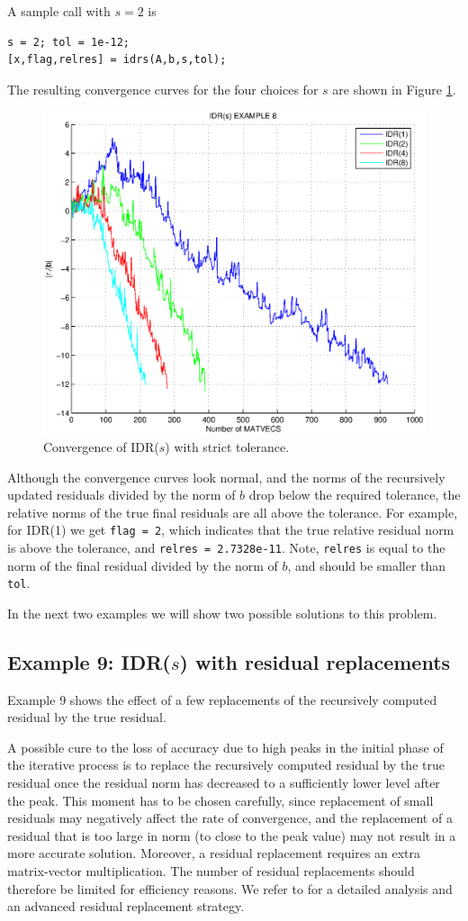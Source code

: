 \documentclass[prodmode,acmtoms]{acmsmall}
\begin{document}
A sample call with $s=2$ is 
\begin{verbatim}
s = 2; tol = 1e-12;
[x,flag,relres] = idrs(A,b,s,tol);
\end{verbatim}

The resulting convergence curves for the four choices for $s$ are shown in Figure \ref{fig:example8}.
\begin{figure}
\centering
\includegraphics[width=.60\linewidth]{example8}
\caption{Convergence of IDR($s$) with strict tolerance.}
\label{fig:example8}
\end{figure}
Although the convergence curves look normal, and the norms of the recursively updated residuals divided by the norm 
of $b$ drop below the required tolerance, the relative norms of the true final residuals are all above the tolerance. 
For example, for IDR(1) we get {\tt flag = 2}, which indicates that the true relative residual norm is above the 
tolerance, and {\tt relres = 2.7328e-11}. Note, {\tt relres} is equal to the norm of the final residual
divided by the norm of $b$, and should be smaller than {\tt tol}. 

In the next two examples we will show two possible solutions to this problem. 

\subsection{Example 9: IDR($s$) with residual replacements}
Example 9 shows the effect of a few replacements of the recursively computed residual by the true residual.

A possible cure to the loss of accuracy due to high peaks in the initial phase of the iterative process is to replace 
the recursively computed residual by the true residual once the residual norm has decreased to a sufficiently lower 
level after the peak. This moment has to be chosen carefully, since replacement of small residuals may negatively  
affect the rate of convergence, and the replacement of a residual that is too large in norm 
(to close to the peak value) may not result in a more accurate solution. Moreover, a residual replacement
requires an extra matrix-vector multiplication. The number of residual replacements should therefore be limited  for 
efficiency reasons.
We refer to \cite{reliable} for a detailed analysis and an advanced residual replacement strategy. 
 
\end{document}
